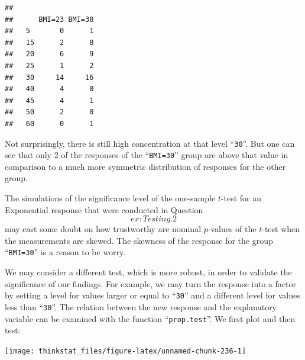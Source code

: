 \documentclass[]{krantz}
\makeatletter
\newenvironment{Shaded}{\begin{snugshade}}{\end{snugshade}}
\newcommand{\KeywordTok}[1]{\textcolor[rgb]{0.13,0.29,0.53}{\textbf{#1}}}
\newcommand{\DataTypeTok}[1]{\textcolor[rgb]{0.13,0.29,0.53}{#1}}
\newcommand{\DecValTok}[1]{\textcolor[rgb]{0.00,0.00,0.81}{#1}}
\newcommand{\OperatorTok}[1]{\textcolor[rgb]{0.81,0.36,0.00}{\textbf{#1}}}
\newcommand{\NormalTok}[1]{#1}
\newenvironment{kframe}{%
\medskip{}
\setlength{\fboxsep}{.8em}
 \def\at@end@of@kframe{}%
 \ifinner\ifhmode%
  \def\at@end@of@kframe{\end{minipage}}%
  \begin{minipage}{\columnwidth}%
 \fi\fi%
 \def\FrameCommand##1{\hskip\@totalleftmargin \hskip-\fboxsep
 \colorbox{shadecolor}{##1}\hskip-\fboxsep
     \hskip-\linewidth \hskip-\@totalleftmargin \hskip\columnwidth}%
 \MakeFramed {\advance\hsize-\width
   \@totalleftmargin\z@ \linewidth\hsize
   \@setminipage}}%
 {\par\unskip\endMakeFramed%
 \at@end@of@kframe}
\renewenvironment{Shaded}{\begin{kframe}}{\end{kframe}}
\theoremstyle{definition}
\theoremstyle{definition}
\theoremstyle{definition}
\theoremstyle{remark}
\makeatother
\begin{document}
\begin{verbatim}
##     
##      BMI=23 BMI=30
##   5       0      1
##   15      2      8
##   20      6      9
##   25      1      2
##   30     14     16
##   40      4      0
##   45      4      1
##   50      2      0
##   60      0      1
\end{verbatim}

Not surprisingly, there is still high concentration at that level
``\texttt{30}''. But one can see that only 2 of the responses of the
``\texttt{BMI=30}'' group are above that value in comparison to a much
more symmetric distribution of responses for the other group.

The simulations of the significance level of the one-sample \(t\)-test
for an Exponential response that were conducted in
Question~\[ex:Testing.2\] may cast some doubt on how trustworthy are
nominal \(p\)-values of the \(t\)-test when the measurements are skewed.
The skewness of the response for the group ``\texttt{BMI=30}'' is a
reason to be worry.

We may consider a different test, which is more robust, in order to
validate the significance of our findings. For example, we may turn the
response into a factor by setting a level for values larger or equal to
``\texttt{30}'' and a different level for values less than
``\texttt{30}''. The relation between the new response and the
explanatory variable can be examined with the function
``\texttt{prop.test}''. We first plot and then test:

\begin{Shaded}
\end{Shaded}

\begin{center}\texttt{[image: thinkstat\_files/figure-latex/unnamed-chunk-236-1]} \end{center}

\begin{Shaded}
\end{Shaded}
\end{document}
